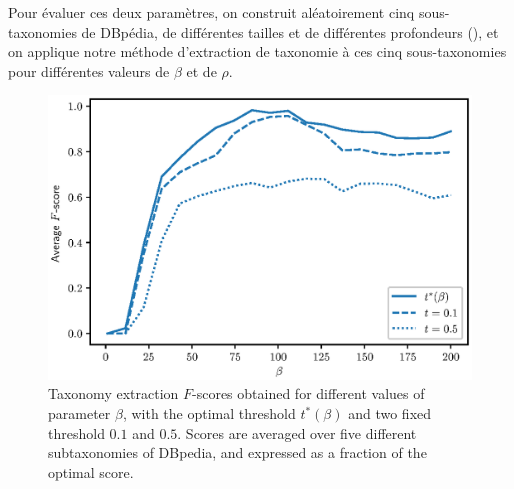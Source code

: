 Pour évaluer ces deux paramètres, on construit aléatoirement cinq sous-taxonomies de DBpédia, de différentes tailles et de différentes profondeurs (), et on applique notre méthode d'extraction de taxonomie à ces cinq sous-taxonomies pour différentes valeurs de $\beta$ et de $\rho$.



\begin{figure}
    \centering
    \includegraphics{fig/plot/average_beta_vs_best.eps}
    \caption[Influence du paramètre $\beta$]{Taxonomy extraction $F$-scores obtained for different values of parameter $\beta$, with the optimal threshold $t^*(\beta)$ and two fixed threshold $0.1$ and $0.5$. Scores are averaged over five different subtaxonomies of DBpedia, and expressed as a fraction of the optimal score.}
    \label{fig:beta-search-1}
\end{figure}

